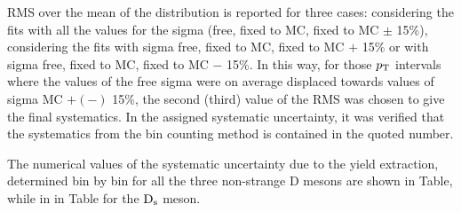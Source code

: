 RMS over the mean of the distribution is reported for three cases: considering the fits with all the values for the sigma (free, fixed to MC, fixed to MC $\pm$ 15\%), considering the fits with sigma free, fixed to MC, fixed to MC $+$ 15\% or with sigma  free, fixed to MC, fixed to MC $-$ 15\%. 
In this way, for those $p_{\rm T}$ intervals where the values of the free sigma were on average displaced towards values of sigma MC $+ (-)$ 15\%, the
second (third) value of the RMS was chosen to give the final systematics. In the assigned systematic uncertainty, it was verified that the
systematics from the bin counting method is contained in the quoted number.

The numerical values of the systematic uncertainty due to the yield extraction, determined bin by bin for all the three non-strange D mesons are shown in Table, while in in Table for the ${\rm D_s}$ meson.



